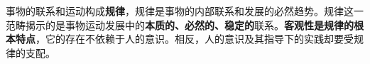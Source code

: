 {事物的联系和运动构成}\textbf{{规律}}{，}规律是事物的内部联系和发展的必然趋势{。规律这一范畴揭示的是事物运动发展中的}\textbf{本质的、必然的、稳定的}{联系。}\textbf{客观性是规律的根本特点}{，它的存在不依赖于人的意识。相反，人的意识及其指导下的实践却要受规律的支配。}
